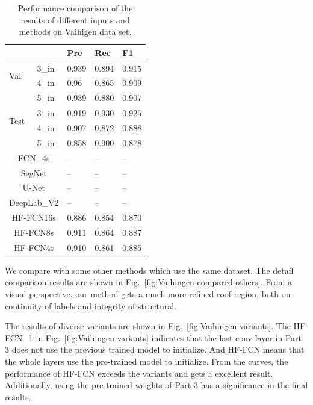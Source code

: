 

\begin{table}[htbp]
\caption {Performance comparison of the results of different inputs and methods on Vaihigen data set. }
\label{table:vaihigen-3-4-5in-comp}
\centering
\begin{tabular}{p{0.5cm}<{\centering}|p{1.1cm}<{\centering}|p{1.1cm}<{\centering}|p{1.1cm}<{\centering}|p{1.1cm}<{\centering}}
\hline
&&Pre&Rec&F1\\
\hline
\multirow{2}{*}{Val}&3\_in&0.939&0.894&$\bm{0.915}$\\
&4\_in&0.96&0.865&0.909\\
&5\_in&0.939&0.880&0.907\\
\hline
\multirow{2}{*}{Test}&3\_in&0.919&0.930&$\bm{0.925}$\\
&4\_in&0.907&0.872&0.888\\
&5\_in&0.858&0.900&0.878\\
\hline\hline
\multicolumn{2}{c|}{FCN\_4s\cite{IEEEexample:Long_2015_CVPR}}&{--}&{--}&{--}\\
\multicolumn{2}{c|}{SegNet\cite{IEEEexample:badrinarayanan2017segnet}}&{--}&{--}&{--}\\
\multicolumn{2}{c|}{U-Net\cite{IEEEexample:ronneberger2015u}}&{--}&{--}&{--}\\
\multicolumn{2}{c|}{DeepLab\_V2\cite{IEEEexample:chen2016deeplab}}&{--}&{--}&{--}\\
\hline \hline
\multicolumn{2}{c|}{HF-FCN16s}&{0.886}&{0.854}&{0.870}\\
\multicolumn{2}{c|}{HF-FCN8s}&{0.911}&{0.864}&{0.887}\\
\multicolumn{2}{c|}{HF-FCN4s}&{0.910}&{0.861}&{0.885}\\
\hline
\end{tabular}
\end{table}

We compare with some other methods which use the same dataset. The detail comparison results are shown in Fig.~\ref{fig:Vaihingen-compared-others}. From a visual perspective, our method gets a much more refined roof region, both on continuity of labels and integrity of structural.

The results of diverse variants are shown in Fig.~\ref{fig:Vaihingen-variants}. The HF-FCN\_1 in Fig.~\ref{fig:Vaihingen-variants} indicates that the last conv layer in Part 3 does not use the previous trained model to initialize. And HF-FCN means that the whole layers use the pre-trained model to initialize. From the curves, the performance of HF-FCN exceeds the variants and gets a excellent result. Additionally, using the pre-trained weights of Part 3 has a significance in the final results.

